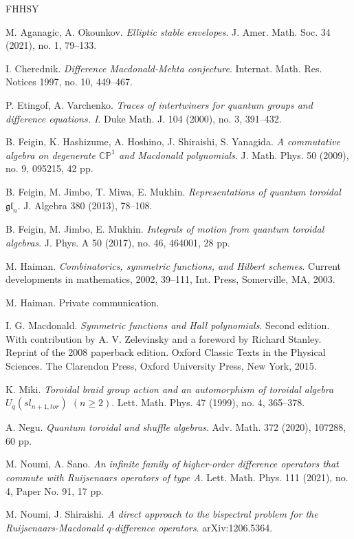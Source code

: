 \documentclass{amsart}
\theoremstyle{remark}
\numberwithin{thm}{section}
\numberwithin{equation}{section}
\begin{document}
\begin{thebibliography}{FHHSY}

M. Aganagic, A. Okounkov.
\textit{Elliptic stable envelopes}.
J. Amer. Math. Soc. 34 (2021), no. 1, 79–133.

I. Cherednik.
\textit{Difference Macdonald-Mehta conjecture}.
Internat. Math. Res. Notices 1997, no. 10, 449–467.

P. Etingof, A. Varchenko.
\textit{Traces of intertwiners for quantum groups and difference equations. I}.
Duke Math. J. 104 (2000), no. 3, 391–432.

B. Feigin, K. Hashizume, A. Hoshino, J. Shiraishi, S. Yanagida.
\textit{A commutative algebra on degenerate $\mathbb{CP}^1$ and Macdonald polynomials}.
J. Math. Phys. 50 (2009), no. 9, 095215, 42 pp.

B. Feigin, M. Jimbo, T. Miwa, E. Mukhin.
\textit{Representations of quantum toroidal ${\mathfrak{gl}}_n$}.
J. Algebra 380 (2013), 78–108.

B. Feigin, M. Jimbo, E. Mukhin.
\textit{Integrals of motion from quantum toroidal algebras}.
J. Phys. A 50 (2017), no. 46, 464001, 28 pp.

M. Haiman.
\textit{Combinatorics, symmetric functions, and Hilbert schemes}. 
Current developments in mathematics, 2002, 39–111, Int. Press, Somerville, MA, 2003.

M. Haiman. Private communication.

I. G. Macdonald. \textit{Symmetric functions and Hall polynomials}. Second edition. With contribution by A. V. Zelevinsky and a foreword by Richard Stanley. Reprint of the 2008 paperback edition. Oxford Classic Texts in the Physical Sciences. The Clarendon Press, Oxford University Press, New York, 2015.

K. Miki.
\textit{Toroidal braid group action and an automorphism of toroidal algebra $U_q(sl_{n+1,tor})$ $(n\ge 2)$}.
Lett. Math. Phys. 47 (1999), no. 4, 365–378.

A. Negu.
\textit{Quantum toroidal and shuffle algebras}. 
Adv. Math. 372 (2020), 107288, 60 pp.

M. Noumi, A. Sano.
\textit{An infinite family of higher-order difference operators that commute with Ruijsenaars operators of type A}.
Lett. Math. Phys. 111 (2021), no. 4, Paper No. 91, 17 pp.

M. Noumi, J. Shiraishi.
\textit{A direct approach to the bispectral problem for the Ruijsenaars-Macdonald $q$-difference operators}. arXiv:1206.5364.


\end{thebibliography}
\end{document}
